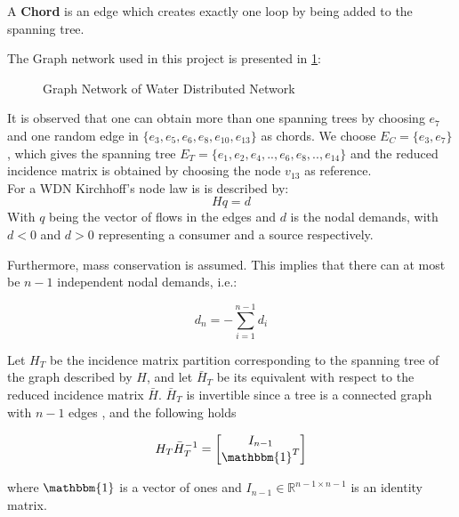 A \textbf{Chord} is an edge which creates exactly one loop by being added to the spanning tree. 


The Graph network used in this project is presented in \cref{fig:tikzWDNGraph}:

\begin{figure}[h!]
	\centering
		\resizebox{\columnwidth}{!}{
	}
	\caption{Graph Network of Water Distributed Network}
	\label{fig:tikzWDNGraph}
\end{figure}
It is observed that one can obtain more than one spanning trees by choosing $ e_7 $ and one random edge in $ \{e_3,e_5,e_6,e_8,e_{10},e_{13}\} $ as chords. We choose 
$ E_C = \{e_3,e_7\} $, which gives the spanning tree 
$ E_T = \{e_1,e_2,e_4,..,e_6,e_8,..,e_{14}\} $ and the reduced incidence matrix is obtained by choosing the node $ v_13 $ as reference.\\

For a WDN Kirchhoff's node law is \cite{Jensen} is described by:
\begin{equation}\label{eq:KirchNodeLaw}
	Hq = d
\end{equation} 
With $ q $ being the vector of flows in the edges and $ d $ is the nodal demands, with $ d<0 $ and $ d>0 $ representing a consumer and a source respectively.   

Furthermore, mass conservation is assumed. This implies that there can at most be $n-1$ independent nodal demands, i.e.:

\begin{equation}\label{eq:MassConservation}
	d_n = -\sum_{i=1}^{n-1}d_i
\end{equation}

\begin{lemma}\label{lem:TreePartitionLemma}
	Let $H_T$ be the incidence matrix partition corresponding to the spanning tree of the graph described by $H$, and let $\bar{H}_T$ be its equivalent with respect to the reduced incidence matrix $\bar{H}$. $\bar{H}_T$ is invertible since a tree is a connected graph with $n-1$ edges \cite{Deo}, and the following holds
	
	\begin{equation}\label{eq:TreePartitionLemma}
		H_T\bar{H}_T^{-1} = \begin{bmatrix} I_{n-1} \\ \mathbbm{1}^T	\end{bmatrix}
	\end{equation}
	
	where $\mathbbm{1}$ is a vector of ones and $I_{n-1} \in \mathbb{R}^{n-1 \times n-1}$ is an identity matrix.
\end{lemma}



